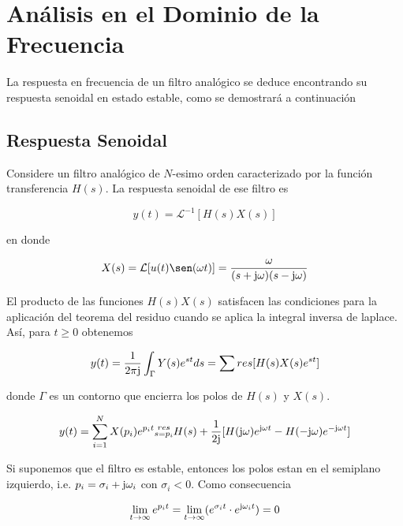 \documentclass[12pt]{book}
\theoremstyle{definition}
\theoremstyle{remark}
\theoremstyle{plain}
\begin{document}
\section{Análisis en el Dominio de la Frecuencia}

La respuesta en frecuencia de un filtro analógico se deduce encontrando su respuesta senoidal  en estado estable, como se demostrará a continuación

\subsection{Respuesta Senoidal}
Considere un filtro analógico de $N$-esimo orden caracterizado por la función transferencia $H(s)$. La respuesta senoidal de ese filtro es

\begin{equation*}
 y(t) = \mathcal{L} ^{-1}[ H(s) X(s)]
\end{equation*}

en donde 

\begin{equation*}
 X(s) = \mathcal{L} [ u(t) \sen (\omega t)] = \frac{\omega}{(s+ \im \omega)(s- \im \omega)}
\end{equation*}

El producto de las funciones $H(s) X(s)$ satisfacen las condiciones para la aplicación del teorema del residuo cuando se aplica la integral inversa de laplace. Así, para $t \geq 0$ obtenemos


\begin{equation}
\label{equ35}
y(t) = \frac{1}{2 \pi \im}  \int_{ \Gamma} Y(s) e^{s t} d s = \sum res[H(s) X(s) e^{st}]
\end{equation}

donde $\Gamma$ es un contorno que encierra los polos de $H(s)$ y $X(s)$.

\begin{equation}
\label{equ36}
y(t) = \sum_{i = 1}^{N} X(p_i) e^{p_i t} \substack{res\\ s = p_i} H(s) + \frac{1}{2 \im}[H(\im \omega) e^{\im \omega t}-H(- \im \omega) e^{- \im \omega t}]
\end{equation}

Si suponemos que el filtro es estable, entonces los polos estan en el semiplano izquierdo, i.e. $p_i= \sigma _i + \im \omega_i$ con $\sigma _i <0$. Como consecuencia

\begin{equation*}
\lim\limits_{t \to\infty} e^{p_i t} = \lim\limits_{t \to\infty} (e^{\sigma _i t} \cdot  e^{\im \omega _i t}) =0
\end{equation*}
\end{document}
